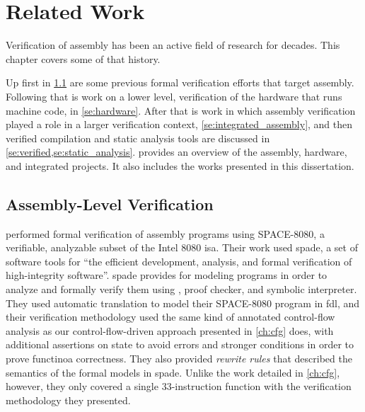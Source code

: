 \chapter{Related Work}\label{ch:related}
Verification of assembly has been an active field of research for decades.
This chapter covers some of that history.

Up first in \cref{se:previous_assembly}
are some previous formal verification efforts that target assembly.
Following that is work on a lower level,
verification of the hardware that runs machine code, in \cref{se:hardware}.
After that is work in which assembly verification played a role
in a larger verification context, \cref{se:integrated_assembly},
and then verified compilation and static analysis tools are discussed
in \cref{se:verified,se:static_analysis}.
 provides an overview of the assembly,
hardware, and integrated projects.
It also includes the works presented in this dissertation.


\section{Assembly-Level Verification}\label{se:previous_assembly}
\textcite{clutterbuck1988verification} performed formal verification
of assembly programs using SPACE-8080, a verifiable,
analyzable subset of the Intel 8080 \ac{isa}.
Their work used \ac{spade}, a set of software tools for ``the efficient development,
analysis, and formal verification of high-integrity software''.
\Ac{spade} provides  for modeling programs
in order to analyze and formally verify them
using , proof checker, and symbolic interpreter.
They used automatic translation to model their SPACE-8080 program
in \ac{fdl}, and their verification methodology used the same kind of
annotated control-flow analysis as our control-flow-driven approach
presented in \cref{ch:cfg} does, with additional assertions on state to avoid errors
and stronger conditions in order to prove functinoa correctness.
They also provided \emph{rewrite rules} that described the semantics
of the formal models in \ac{spade}. Unlike the work detailed in \cref{ch:cfg}, however,
they only covered a single 33-instruction function
with the verification methodology they presented.

